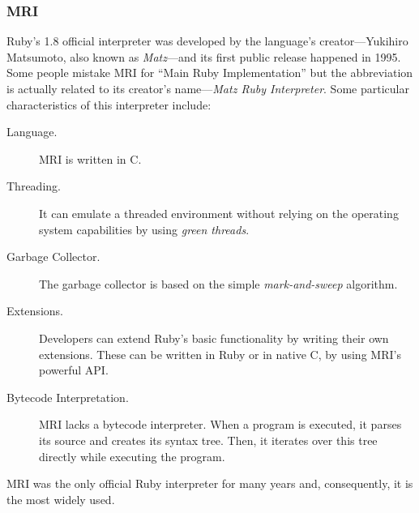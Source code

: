 \subsubsection{MRI}
Ruby's 1.8 official interpreter was developed by the language's creator---Yukihiro Matsumoto, also known as \emph{Matz}---and its first public release happened in 1995. Some people mistake MRI for ``Main Ruby Implementation'' but the abbreviation is actually related to its creator's name---\emph{Matz Ruby Interpreter}. Some particular characteristics of this interpreter include:
\begin{description}
\item[Language.] MRI is written in C.
\item[Threading.] It can emulate a threaded environment without relying on the operating system capabilities by using \textit{green threads}.
\item[Garbage Collector.] The garbage collector is based on the simple \textit{mark-and-sweep} algorithm.
\item[Extensions.]  Developers can extend Ruby's basic functionality by writing their own extensions. These can be written in Ruby or in native C, by using MRI's powerful API.
\item[Bytecode Interpretation.] MRI lacks a bytecode interpreter. When a program is executed, it parses its source and creates its syntax tree. Then, it iterates over this tree directly while executing the program.
\end{description}
MRI was the only official Ruby interpreter for many years and, consequently, it is the most widely used.


